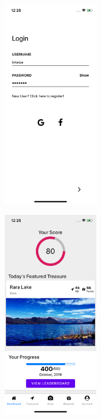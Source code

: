 \documentclass[12pt, a4paper, oneside]{article}
\begin{document}
\begin{figure}[H]

\begin{subfigure}{.5\textwidth}
    \centering
    \includegraphics[width=0.45\textwidth]{test-evidences/auth/a.png}
    \caption{}
\end{subfigure}%
\begin{subfigure}{.5\textwidth}
    \centering
    \includegraphics[width=0.45\textwidth]{test-evidences/auth/b.png}
    \caption{}
\end{subfigure}


\end{figure}
\end{document}
